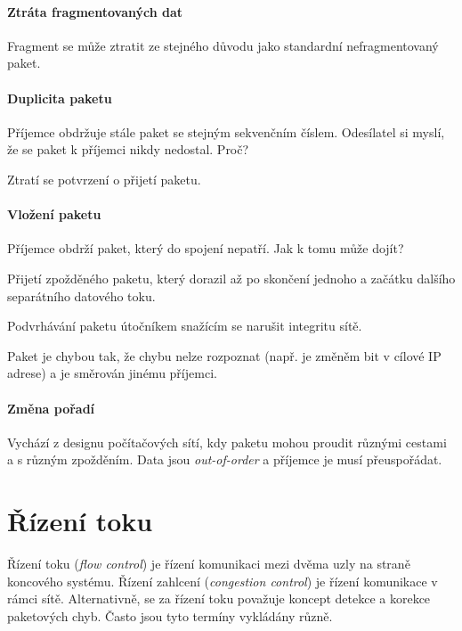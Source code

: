 \paragraph*{Ztráta fragmentovaných dat} Fragment se může ztratit ze stejného důvodu jako standardní nefragmentovaný paket.

\paragraph*{Duplicita paketu} Příjemce obdržuje stále paket se stejným sekvenčním číslem. Odesílatel si myslí, že se paket k příjemci nikdy nedostal. Proč? \begin{compactitem}
    \item Ztratí se potvrzení o přijetí paketu.
\end{compactitem}

\paragraph*{Vložení paketu} Příjemce obdrží paket, který do spojení nepatří. Jak k tomu může dojít? \begin{compactitem}
    \item Přijetí zpožděného paketu, který dorazil až po skončení jednoho a začátku dalšího separátního datového toku.
    \item Podvrhávání paketu útočníkem snažícím se narušit integritu sítě.
    \item Paket je chybou  tak, že chybu nelze rozpoznat (např. je změněm bit v cílové IP adrese) a je směrován jinému příjemci.
\end{compactitem}

\paragraph*{Změna pořadí} Vychází z designu počítačových sítí, kdy paketu mohou proudit různými cestami a s různým zpožděním. Data jsou \textit{out-of-order} a příjemce je musí přeuspořádat.


\section{Řízení toku}

Řízení toku (\textit{flow control}) je řízení komunikaci mezi dvěma uzly na straně koncového systému. Řízení zahlcení (\textit{congestion control}) je řízení komunikace v rámci sítě. Alternativně, se za řízení toku považuje koncept detekce a korekce paketových chyb. Často jsou tyto termíny vykládány různě.

